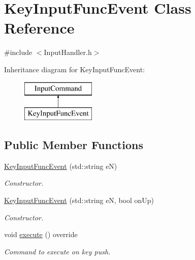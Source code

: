 \hypertarget{class_key_input_func_event}{}\section{Key\+Input\+Func\+Event Class Reference}
\label{class_key_input_func_event}


{\ttfamily \#include $<$Input\+Handler.\+h$>$}

Inheritance diagram for Key\+Input\+Func\+Event\+:\begin{figure}[H]
\begin{center}
\leavevmode
\includegraphics[height=2.000000cm]{class_key_input_func_event}
\end{center}
\end{figure}
\subsection*{Public Member Functions}
\begin{DoxyCompactItemize}
\item 
\mbox{\label{class_key_input_func_event_a91cc8f1399b3ecfbd58e62d82629ab89}} 
\mbox{\hyperlink{class_key_input_func_event_a91cc8f1399b3ecfbd58e62d82629ab89}{Key\+Input\+Func\+Event}} (std\+::string eN)
\begin{DoxyCompactList}\small\item\em Constructor. \end{DoxyCompactList}\item 
\mbox{\label{class_key_input_func_event_a7bfef1504d75dae97025d722640a10b1}} 
\mbox{\hyperlink{class_key_input_func_event_a7bfef1504d75dae97025d722640a10b1}{Key\+Input\+Func\+Event}} (std\+::string eN, bool on\+Up)
\begin{DoxyCompactList}\small\item\em Constructor. \end{DoxyCompactList}\item 
\mbox{\label{class_key_input_func_event_af426cca105b31799f0fb3fd3716c37fb}} 
void \mbox{\hyperlink{class_key_input_func_event_af426cca105b31799f0fb3fd3716c37fb}{execute}} () override
\begin{DoxyCompactList}\small\item\em Command to execute on key push. \end{DoxyCompactList}\end{DoxyCompactItemize}

